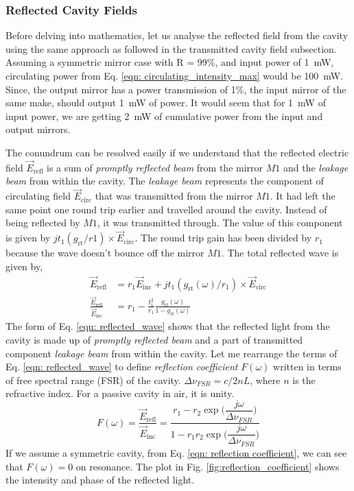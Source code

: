 \documentclass{Resources/cquicc}
\begin{document}
\subsubsection{Reflected Cavity Fields}
Before delving into mathematics, let us analyse the reflected field from the cavity using the same approach as followed in the transmitted cavity field subsection. Assuming a symmetric mirror case with R = 99\%, and input power of 1~mW, circulating power from Eq. \ref{eqn: circulating_intensity_max} would be 100~mW. Since, the output mirror has a power transmission of 1\%, the input mirror of the same make, should output 1~mW of power. It would seem that for 1~mW of input power, we are getting 2~mW of cumulative power from the input and output mirrors. \par
The conundrum can be resolved easily if we understand that the reflected electric field $\vec{E}_{\text{refl}}$ is a sum of \textit{promptly reflected beam} from the mirror $M1$ and the \textit{leakage beam} from within the cavity. The \textit{leakage beam} represents the component of circulating field $\vec{E}_{\text{circ}}$ that was transmitted from the mirror $M1$. It had left the same point one round trip earlier and travelled around the cavity. Instead of being reflected by $M1$, it was transmitted through. The value of this component is given by $jt_1(g_{\text{rt}}/r1)\times \vec{E}_{\text{circ}}$. The round trip gain has been divided by $r_1$ because the wave doesn't bounce off the mirror $M1$. The total reflected wave is given by, 
\begin{equation}
    \label{eqn: reflected_wave}
    \begin{split}
    \vec{E}_{\text{refl}} & = r_1 \vec{E}_{\text{inc}} + jt_1(g_{\text{rt}}(\omega)/r_1)\times \vec{E}_{\text{circ}} \\
    \frac{\vec{E}_{\text{refl}}}{\vec{E}_{\text{inc}}} & = r_1 - \frac{t_1^2}{r_1}\frac{g_{\text{rt}}(\omega)}{1-g_{\text{rt}}(\omega)}
    \end{split}
\end{equation}
The form of Eq. \ref{eqn: reflected_wave} shows that the reflected light from the cavity is made up of \textit{promptly reflected beam} and a part of transmitted component \textit{leakage beam} from within the cavity. Let me rearrange the terms of Eq. \ref{eqn: reflected_wave} to define \textit{reflection coefficient} $F(\omega)$ written in terms of free spectral range (FSR) of the cavity. $\Delta \nu_{FSR} = c/2nL$, where $n$ is the refractive index. For a passive cavity in air, it is unity. 
\begin{equation}
    \label{eqn: reflection coefficient}
    F(\omega) = \dfrac{\vec{E}_{\text{refl}}}{\vec{E}_{\text{inc}}}  = \dfrac{r_1 - r_2 \exp\Big(\dfrac{j\omega}{\Delta \nu_{FSR}}\Big)}{1-r_1r_2\exp\Big(\dfrac{j\omega}{\Delta \nu_{FSR}}\Big)}
\end{equation}
If we assume a symmetric cavity, from Eq. \ref{eqn: reflection coefficient}, we can see that $F(\omega) = 0$ on resonance. The plot in Fig. \ref{fig:reflection_coefficient} shows the intensity and phase of the reflected light. 
\end{document}
